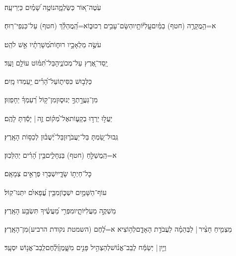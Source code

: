 \documentclass[12pt]{article}
\newcommand{\loc}[1]{\textsuperscript{\locf{#1}}}
\begin{document}
{\loc{ ב}~}‏עֹֽטֶה־א֭וֹר כַּשַּׂלְמָ֑ה{\hfill}נוֹטֶ֥ה שָׁ֝מַ֗יִם כַּיְרִיעָֽה׃\par

{\loc{ ג}~}‏א=הַ֥מֲקָרֶ֥ה (חטף) בַמַּ֗יִם{\hfill}עֲֽלִיּ֫וֹתָ֥יו\newline\hspace*{.5em}הַשָּׂם־עָבִ֥ים רְכוּב֑וֹ{\hfill}א=הַֽ֝מֲהַלֵּ֗ךְ (חטף) עַל־כַּנְפֵי־רֽוּחַ׃\par

{\loc{ ד}~}‏עֹשֶׂ֣ה מַלְאָכָ֣יו רוּח֑וֹת{\hfill}מְ֝שָׁרְתָ֗יו אֵ֣שׁ לֹהֵֽט׃\par

{\loc{ ה}~}‏יָֽסַד־אֶ֭רֶץ עַל־מְכוֹנֶ֑יהָ{\hfill}בַּל־תִּ֝מּ֗וֹט עוֹלָ֥ם וָעֶֽד׃\par

{\loc{ ו}~}‏ כַּלְּב֣וּשׁ כִּסִּית֑וֹ{\hfill}עַל־הָ֝רִ֗ים יַ֖עַמְדוּ מָֽיִם׃\par

{\loc{ ז}~}‏מִן־גַּעֲרָ֣תְךָ֣ יְנוּס֑וּן{\hfill}מִן־ק֥וֹל רַ֝עַמְךָ֗ יֵחָפֵזֽוּן׃\par

{\loc{ ח}~}‏יַעֲל֣וּ  יֵרְד֣וּ בְקָע֑וֹת{\hfill}אֶל־מְ֝ק֗וֹם זֶ֤ה |  יָסַ֬דְתָּ לָהֶֽם׃\par

{\loc{ ט}~}‏גְּֽבוּל־שַׂ֭מְתָּ בַּל־יַעֲבֹר֑וּן{\hfill}בַּל־יְ֝שֻׁב֗וּן לְכַסּ֥וֹת הָאָֽרֶץ׃\par

{\loc{ י}~}‏א=הַֽמֲשַׁלֵּ֣חַ (חטף)  בַּנְּחָלִ֑ים{\hfill}בֵּ֥ין הָ֝רִ֗ים יְהַלֵּכֽוּן׃\par

{\loc{ יא}~}‏ כׇּל־חַיְת֣וֹ שָׂדָ֑י{\hfill}יִשְׁבְּר֖וּ פְרָאִ֣ים צְמָאָֽם׃\par

{\loc{ יב}~}‏ עוֹף־הַשָּׁמַ֣יִם יִשְׁכּ֑וֹן{\hfill}מִבֵּ֥ין עֳ֝פָאיִ֗ם יִתְּנוּ־קֽוֹל׃\par

{\loc{ יג}~}‏מַשְׁקֶ֣ה  מֵעֲלִיּוֹתָ֑יו{\hfill}מִפְּרִ֥י מַ֝עֲשֶׂ֗יךָ תִּשְׂבַּ֥ע הָאָֽרֶץ׃\par

{\loc{ יד}~}‏מַצְמִ֤יחַ חָצִ֨יר |  לַבְּהֵמָ֗ה{\hfill} לַעֲבֹדַ֣ת הָאָדָ֑ם\newline\hspace*{.5em}לְה֥וֹצִיא א=לֶ֝חֶם (השמטת נקודת הרביע){\hfill}מִן־הָאָֽרֶץ׃\par

{\loc{ טו}~}‏וְיַ֤יִן |  יְשַׂמַּ֬ח לְֽבַב־אֱנ֗וֹשׁ{\hfill}לְהַצְהִ֣יל פָּנִ֣ים מִשָּׁ֑מֶן\newline\hspace*{.5em}וְ֝לֶ֗חֶם{\hfill}לְֽבַב־אֱנ֥וֹשׁ יִסְעָֽד׃\par
\end{document}
